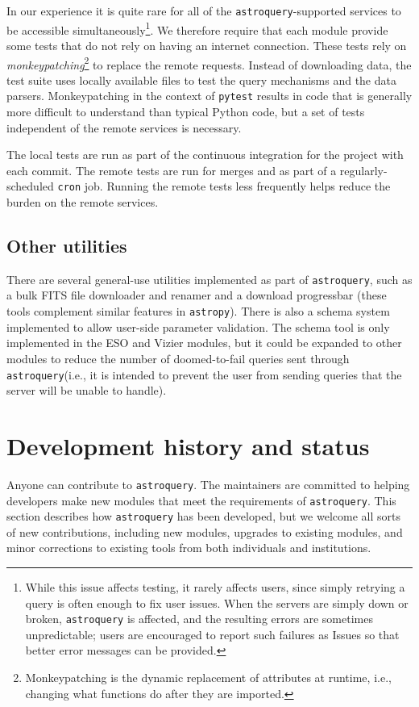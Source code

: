 \documentclass[twocolumn]{aastex62}
\newcommand{\package}[1]{\texttt{#1}\xspace}
\newcommand{\astroquery}{\package{astroquery}}
\newcommand{\astropypkg}{\package{astropy}}
\begin{document}
In our experience it is quite rare for all of the \astroquery-supported
services to be accessible simultaneously\footnote{While this issue affects
testing, it rarely affects users, since simply retrying a query is often
enough to fix user issues.  When the servers are simply down or broken,
\astroquery is affected, and the resulting errors are sometimes unpredictable;
users are encouraged to report such failures as Issues so that better error
messages can be provided.}. We therefore require that each
module provide some tests that do not rely on having an internet connection.
These tests rely on \emph{monkeypatching}\footnote{Monkeypatching is the
  dynamic replacement of attributes at runtime, i.e., changing what
  functions do after they are imported.} to replace the remote
requests. Instead of downloading data, the test suite uses locally available
files to test the query mechanisms and the data parsers.  Monkeypatching in
the context of \package{pytest} results in code that is generally more
difficult to understand than typical Python code, but a set of tests
independent of the remote services is necessary.

The local tests are run as part of the continuous integration for the
project with each commit.  The remote tests are run for merges and as part of a
regularly-scheduled \texttt{cron} job.  Running the remote tests less frequently
helps reduce the burden on the remote services.

\subsection{Other utilities}
There are several general-use utilities implemented as part of \astroquery, such
as a bulk FITS file downloader and renamer and a download progressbar (these
tools complement similar features in \astropypkg).  There
is also a schema system implemented to allow user-side parameter validation.
The schema tool is only implemented in the ESO and Vizier modules, but it could
be expanded to other modules to reduce the number of doomed-to-fail queries
sent through \astroquery (i.e., it is intended to prevent the user from sending
queries that the server will be unable to handle).

\section{Development history and status}
\label{sec:development}
Anyone can contribute to \astroquery.  The maintainers are committed to helping
developers make new modules that meet the requirements of \astroquery.  This
section describes how \astroquery has been developed, but we welcome all sorts
of new contributions, including new modules, upgrades to existing modules, and
minor corrections to existing tools from both individuals and institutions.
\end{document}
